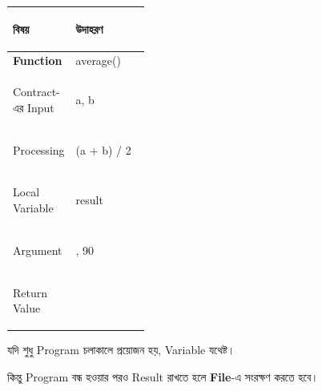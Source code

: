 \begin{tabularx}
{\linewidth}
{
|>{\bfseries\RaggedRight\arraybackslash}p{0.34\linewidth}
|Y|
}

\hline
{}

\textbf{বিষয়}
&
\textbf{উদাহরণ}
\\
\hline

Function
&
\textenglish{\ttfamily average()}
\\
\hline

Contract-এর Input
&
\textenglish{\ttfamily a, b}
\\
\hline

Processing
&
\textenglish{\ttfamily (a + b) / 2}
\\
\hline

Local Variable
&
\textenglish{\ttfamily result}
\\
\hline

Argument
&
\textenglish{, 90}
\\
\hline

Return Value
&
\textenglish{}
\\
\hline

\end{tabularx}

যদি
\textenglish{}
শুধু Program চলাকালে প্রয়োজন হয়, Variable যথেষ্ট।

কিন্তু Program বন্ধ হওয়ার পরও Result রাখতে হলে
\textbf{File}-এ সংরক্ষণ করতে হবে।



